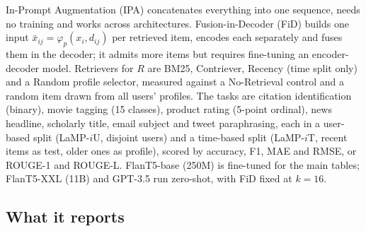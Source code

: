 \begin{center}
\end{center}

In-Prompt Augmentation (IPA) concatenates everything into one sequence, needs no training and works across architectures. Fusion-in-Decoder (FiD) builds one input $\bar{x}_{ij} = \varphi_p(x_i, d_{ij})$ per retrieved item, encodes each separately and fuses them in the decoder; it admits more items but requires fine-tuning an encoder-decoder model. Retrievers for $R$ are BM25, Contriever, Recency (time split only) and a Random profile selector, measured against a No-Retrieval control and a random item drawn from all users' profiles. The tasks are citation identification (binary), movie tagging (15 classes), product rating (5-point ordinal), news headline, scholarly title, email subject and tweet paraphrasing, each in a user-based split (LaMP-$i$U, disjoint users) and a time-based split (LaMP-$i$T, recent items as test, older ones as profile), scored by accuracy, F1, MAE and RMSE, or ROUGE-1 and ROUGE-L. FlanT5-base (250M) is fine-tuned for the main tables; FlanT5-XXL (11B) and GPT-3.5 run zero-shot, with FiD fixed at $k = 16$.

\subsection{What it reports}

